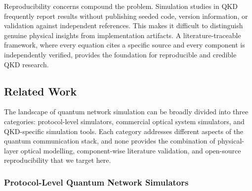 \documentclass[11pt,a4paper]{article}
\begin{document}
Reproducibility concerns compound the problem.  Simulation studies in
QKD frequently report results without publishing seeded code, version
information, or validation against independent references.  This makes
it difficult to distinguish genuine physical insights from implementation
artifacts.  A literature-traceable framework, where every equation cites
a specific source and every component is independently verified, provides
the foundation for reproducible and credible QKD research.

\subsection{Related Work}

The landscape of quantum network simulation can be broadly divided into
three categories: protocol-level simulators, commercial optical system
simulators, and QKD-specific simulation tools.  Each category addresses
different aspects of the quantum communication stack, and none provides
the combination of physical-layer optical modelling, component-wise
literature validation, and open-source reproducibility that we target here.

\subsubsection{Protocol-Level Quantum Network Simulators}
\end{document}
